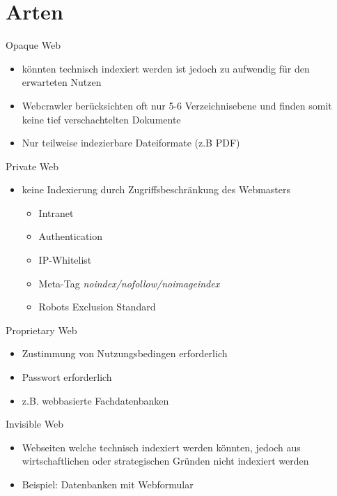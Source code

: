 \documentclass[12pt]{beamer}
\begin{document}
\section{Arten}
\begin{frame}{Opaque Web}
	\begin{itemize}
		\item könnten technisch indexiert werden ist jedoch zu aufwendig für den erwarteten Nutzen
		\item Webcrawler berücksichten oft nur 5-6 Verzeichnisebene und finden somit keine tief verschachtelten Dokumente
		\item Nur teilweise indezierbare Dateiformate (z.B PDF)
	\end{itemize}
\end{frame}
\begin{frame}{Private Web}
	\begin{itemize}
		\item keine Indexierung durch Zugriffsbeschränkung des Webmasters 
		\begin{itemize}
			\item Intranet
			\item Authentication
			\item IP-Whitelist
			\item Meta-Tag \textit{noindex/nofollow/noimageindex}
			\item \glqq Robots Exclusion Standard\grqq
		\end{itemize}	
	\end{itemize}
\end{frame}
\begin{frame}{Proprietary Web}
	\begin{itemize}
		\item Zustimmung von Nutzungsbedingen erforderlich
		\item Passwort erforderlich
		\item z.B. webbasierte Fachdatenbanken
	\end{itemize}
\end{frame}
\begin{frame}{Invisible Web}
	\begin{itemize}
		\item Webseiten welche technisch indexiert werden könnten, jedoch aus wirtschaftlichen oder strategischen Gründen nicht indexiert werden
		\item Beispiel: Datenbanken mit Webformular
	\end{itemize}
\end{frame}
\end{document}
